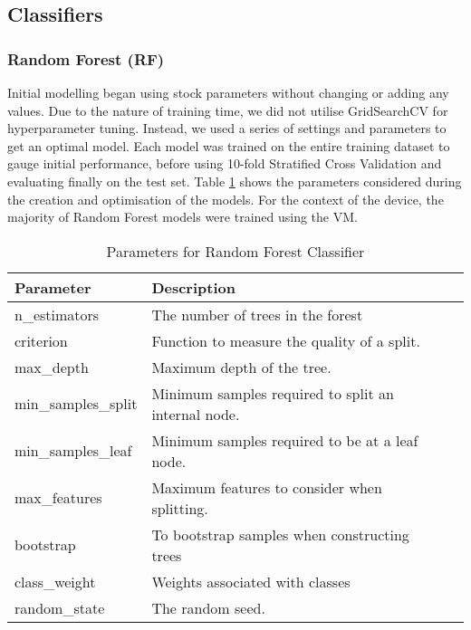 \subsection{Classifiers}


\subsubsection{Random Forest (RF)}
\label{sec:RF}

Initial modelling began using stock parameters without changing or adding any values. Due to the nature of training time, we did not utilise GridSearchCV for hyperparameter tuning. Instead, we used a series of settings and parameters to get an optimal model. Each model was trained on the entire training dataset to gauge initial performance, before using 10-fold Stratified Cross Validation and evaluating finally on the test set. Table \ref{tab:rf-params} shows the parameters considered during the creation and optimisation of the models. For the context of the device, the majority of Random Forest models were trained using the VM.

\begin{table}[h]
\centering
\caption{Parameters for Random Forest Classifier}
\label{tab:rf-params}
\begin{tabular}{|l|l|l|}
\hline
\textbf{Parameter} & \textbf{Description} \\ \hline
n\_estimators & The number of trees in the forest\\
criterion & Function to measure the quality of a split.\\
max\_depth & Maximum depth of the tree. \\
min\_samples\_split & Minimum samples required to split an internal node. \\ 
min\_samples\_leaf & Minimum samples required to be at a leaf node. \\
max\_features & Maximum features to consider when splitting. \\
bootstrap & To bootstrap samples when constructing trees \\
class\_weight & Weights associated with classes \\
random\_state & The random seed.\\ \hline
\end{tabular}
\end{table}

